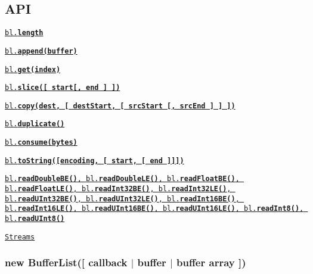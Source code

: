 \subsection*{A\+P\+I}


\begin{DoxyItemize}
\item \href{#ctor}{\tt {}}
\item \href{#length}{\tt {\ttfamily bl.{\bfseries length}}}
\item \href{#append}{\tt {\ttfamily bl.{\bfseries append(buffer)}}}
\item \href{#get}{\tt {\ttfamily bl.{\bfseries get(index)}}}
\item \href{#slice}{\tt {\ttfamily bl.{\bfseries slice(\mbox{[} start\mbox{[}, end \mbox{]} \mbox{]})}}}
\item \href{#copy}{\tt {\ttfamily bl.{\bfseries copy(dest, \mbox{[} dest\+Start, \mbox{[} src\+Start \mbox{[}, src\+End \mbox{]} \mbox{]} \mbox{]})}}}
\item \href{#duplicate}{\tt {\ttfamily bl.{\bfseries duplicate()}}}
\item \href{#consume}{\tt {\ttfamily bl.{\bfseries consume(bytes)}}}
\item \href{#toString}{\tt {\ttfamily bl.{\bfseries to\+String(\mbox{[}encoding, \mbox{[} start, \mbox{[} end \mbox{]}\mbox{]}\mbox{]})}}}
\item \href{#readXX}{\tt {\ttfamily bl.{\bfseries read\+Double\+B\+E()}}, {\ttfamily bl.{\bfseries read\+Double\+L\+E()}}, {\ttfamily bl.{\bfseries read\+Float\+B\+E()}}, {\ttfamily bl.{\bfseries read\+Float\+L\+E()}}, {\ttfamily bl.{\bfseries read\+Int32\+B\+E()}}, {\ttfamily bl.{\bfseries read\+Int32\+L\+E()}}, {\ttfamily bl.{\bfseries read\+U\+Int32\+B\+E()}}, {\ttfamily bl.{\bfseries read\+U\+Int32\+L\+E()}}, {\ttfamily bl.{\bfseries read\+Int16\+B\+E()}}, {\ttfamily bl.{\bfseries read\+Int16\+L\+E()}}, {\ttfamily bl.{\bfseries read\+U\+Int16\+B\+E()}}, {\ttfamily bl.{\bfseries read\+U\+Int16\+L\+E()}}, {\ttfamily bl.{\bfseries read\+Int8()}}, {\ttfamily bl.{\bfseries read\+U\+Int8()}}}
\item \href{#streams}{\tt Streams} 

 \label{_ctor}%
 \subsubsection*{new Buffer\+List(\mbox{[} callback $\vert$ buffer $\vert$ buffer array \mbox{]})}
\end{DoxyItemize}

